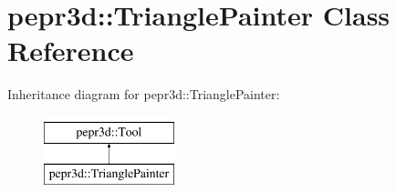 \hypertarget{classpepr3d_1_1_triangle_painter}{}\section{pepr3d\+::Triangle\+Painter Class Reference}
\label{classpepr3d_1_1_triangle_painter}
Inheritance diagram for pepr3d\+::Triangle\+Painter\+:\begin{figure}[H]
\begin{center}
\leavevmode
\includegraphics[height=2.000000cm]{classpepr3d_1_1_triangle_painter}
\end{center}
\end{figure}
